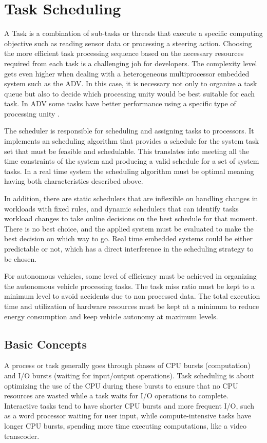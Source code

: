 \section{Task Scheduling}
\label{sec:task-scheduling}
A Task is a combination of sub-tasks or threads that execute a specific computing objective such as reading sensor data or processing a steering action. Choosing the more efficient task processing sequence based on the necessary resources required from each task is a challenging job for developers. The complexity level gets even higher when dealing with a heterogeneous multiprocessor embedded system such as the ADV. In this case, it is necessary not only to organize a task queue but also to decide which processing unity would be best suitable for each task. In ADV some tasks have better performance using a specific type of processing unity \cite{Liu2017}. 

The scheduler is responsible for scheduling and assigning tasks to processors. It implements an scheduling algorithm that provides a schedule for the system task set that must be feasible and schedulable. This translates into meeting all the time constraints of the system and producing a valid schedule for a set of system tasks. In a real time system the scheduling algorithm must be optimal meaning having both characteristics described above.

In addition, there are static schedulers that are inflexible on handling changes in workloads with fixed rules, and dynamic schedulers that can identify tasks workload changes to take online decisions on the best schedule for that moment. There is no best choice, and the applied system must be evaluated to make the best decision on which way to go. Real time embedded systems could be either predictable or not, which has a direct interference in the scheduling strategy to be chosen. \cite{yang2020}


For autonomous vehicles, some level of efficiency must be achieved in organizing the autonomous vehicle processing tasks. The task miss ratio must be kept to a minimum level to avoid accidents due to non processed data. The total execution time and utilization of hardware resources must be kept at a minimum to reduce energy consumption and keep vehicle autonomy at maximum levels.

\subsection{Basic Concepts}
A process or task \cite{chakraborty2024} generally goes through phases of CPU bursts (computation) and I/O bursts (waiting for input/output operations). Task scheduling is about optimizing the use of the CPU during these bursts to ensure that no CPU resources are wasted while a task waits for I/O operations to complete. Interactive tasks tend to have shorter CPU bursts and more frequent I/O, such as a word processor waiting for user input, while compute-intensive tasks have longer CPU bursts, spending more time executing computations, like a video transcoder.

